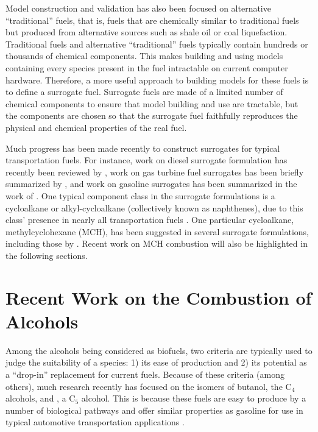 \documentclass[../main.tex]{subfiles}
\begin{document}
Model construction and validation has also been focused on alternative ``traditional''
fuels, that is, fuels that are chemically similar to traditional fuels but
produced from alternative sources such as shale oil or coal liquefaction.
Traditional fuels and alternative ``traditional'' fuels typically contain
hundreds or thousands of chemical components. This makes building and using
models containing every species present in the fuel intractable on current
computer hardware. Therefore, a more useful approach to building models for
these fuels is to define a surrogate fuel. Surrogate fuels are made of a
limited number of chemical components to ensure that model building and use
are tractable, but the components are chosen so that the surrogate fuel
faithfully reproduces the physical and chemical properties of the real fuel.

Much progress has been made recently to construct surrogates for typical
transportation fuels. For instance, work on diesel surrogate formulation has
recently been reviewed by \textcite{Pitz2011}, work on gas turbine fuel
surrogates has been briefly summarized by \textcite{Dooley2012}, and work on
gasoline surrogates has been summarized in the work of \textcite{Anand2011,Pitz2007}.
One typical component class in the surrogate formulations is a cycloalkane or
alkyl-cycloalkane (collectively known as naphthenes), due to this class' presence
in nearly all transportation fuels \cite{Pitz2007, Briker2001, Farrell2007,
Edwards2007}. One particular cycloalkane, methylcyclohexane (MCH),
has been suggested in several surrogate formulations, including those by
\textcite{Bieleveld2009,Naik2005}. Recent work on MCH combustion will also
be highlighted in the following sections.

\section{Recent Work on the Combustion of Alcohols}

Among the alcohols being considered as biofuels, two criteria are typically
used to judge the suitability of a species: 1) its ease of production and
2) its potential as a ``drop-in'' replacement for current fuels. Because
of these criteria (among others), much research recently has focused on
the isomers of butanol, the C$_4$ alcohols, and \iPeOH{}, a C$_5$
alcohol. This is because these fuels are easy to produce by a number of biological
pathways \cite{Peralta-Yahya2012} and offer similar properties as
gasoline for use in typical automotive transportation applications \cite{Afeefy2014,
Davis2013}.
\end{document}
